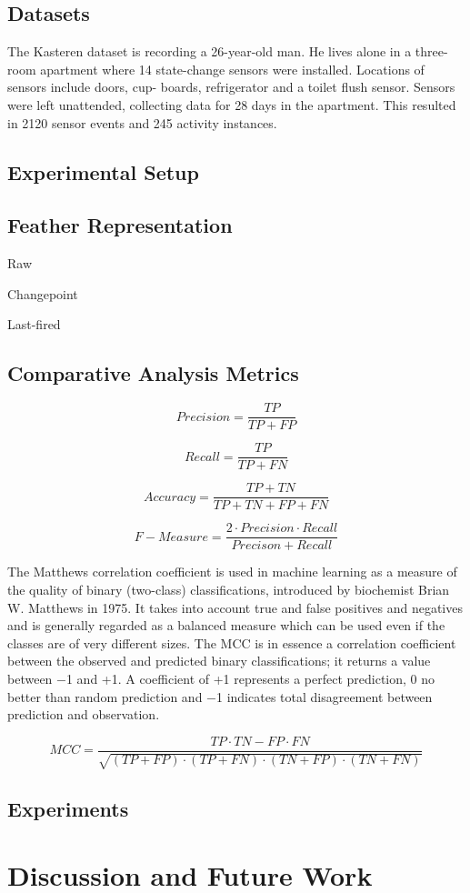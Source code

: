 \documentclass[11pt, oneside]{article}   	%
\begin{document}
\subsection{Datasets}

The Kasteren dataset is recording a 26-year-old man. He lives alone in a three-room apartment where 14 state-change sensors were installed. Locations of sensors include doors, cup- boards, refrigerator and a toilet flush sensor. Sensors were left unattended, collecting data for 28 days in the apartment. This resulted in 2120 sensor events and 245 activity instances.


\subsection{Experimental Setup}

\subsection{Feather Representation}

 Raw

Changepoint

Last-fired


\subsection{Comparative Analysis Metrics}

\begin{equation}
Precision = \frac{TP}{TP+FP}
\end{equation}

\begin{equation}
Recall = \frac{TP}{TP+FN}
\end{equation}

\begin{equation}
Accuracy = \frac{TP+TN}{TP+TN+FP+FN}
\end{equation}

\begin{equation}
F-Measure = \frac{2\cdot Precision\cdot Recall}{Precison+Recall}
\end{equation}

The Matthews correlation coefficient is used in machine learning as a measure of the quality of binary (two-class) classifications, introduced by biochemist Brian W. Matthews in 1975. It takes into account true and false positives and negatives and is generally regarded as a balanced measure which can be used even if the classes are of very different sizes. The MCC is in essence a correlation coefficient between the observed and predicted binary classifications; it returns a value between −1 and +1. A coefficient of +1 represents a perfect prediction, 0 no better than random prediction and −1 indicates total disagreement between prediction and observation.

\begin{equation}
MCC=\frac{TP\cdot TN-FP\cdot FN}{\sqrt{(TP+FP)\cdot (TP+FN)\cdot (TN+FP)\cdot (TN+FN)}}
\end{equation}


\subsection{Experiments}

	

\section{Discussion and Future Work}
\end{document}
